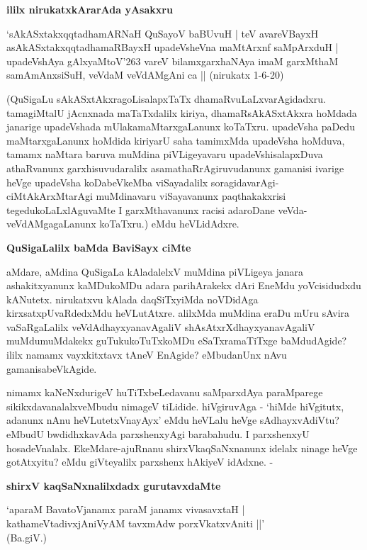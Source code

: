 {\bigskip
\noindent
{\large\bf ililx nirukatxkArarAda yAsakxru}}
\medskip

\begin{shloka}
`sAkASxtakxqqtadhamARNaH QuSayoV baBUvuH | teV avareVBayxH\\\label{106}
asAkASxtakxqqtadhamaRBayxH upadeVsheVna maMtArxnf saMpArxduH |\\
upadeVshAya gAlxyaMtoV\char'263 vareV bilamxgarxhaNAya imaM garxMthaM\\
samAmAnxsiSuH, veVdaM veVdAMgAni ca || \hfill{(nirukatx 1-6-20)}
\end{shloka}

\noindent
(QuSigaLu sAkASxtAkxragoLisalapxTaTx dhamaRvuLaLxvarAgidadxru. tamagiMtalU \hbox{jAcnxnada} maTaTxdalilx kiriya, dha\-maR\-sAkASxtAkxra hoMdada janarige upadeVshada mUlaka\break maMtarxgaLanunx koTaTxru. upadeVsha pa\-De\-du maMtarx\-gaLanunx hoMdida kiriyarU saha tamimxMda upadeVsha hoMduva, tamamx naMtara baruva muMdina\- piVLige\-yavaru upadeVshisalapxDuva athaRvanunx garxhisuvudaralilx asamathaRrAgiruvudanunx gamanisi iva\-rige heVge upadeVsha koDabeVkeMba viSayadalilx soragidavarAgi-ciMtA\-kArxMtarAgi muMdinavaru viSa\-yavanunx paqthakakxrisi tegedukoLaLxlAguvaMte I garxMthavanunx racisi adaroDane veVda-veVdAMgagaLanunx koTaTxru.) eMdu heVLidAdxre.

{\bigskip
\noindent
{\large\bf QuSigaLalilx baMda BaviSayx ciMte}}\label{page106}
\medskip

\noindent
aMdare, aMdina QuSigaLa kAladalelxV muMdina piVLigeya janara ashakitxyanunx kaMDukoMDu adara pari\-hArakekx dAri EneMdu yoVcisidudxdu kANutetx. nirukatxvu kAlada daqSiTxyiMda noVDidAga kirxsatxpUvaR\-dedxMdu heVLutAtxre. alilxMda muMdina eraDu mUru sAvira vaSaRgaLalilx veVdAdhayxyanavAgaliV shAsAtxrX\-dhayxyanavAgaliV muMdumuMdakekx guTukukoTuTxkoMDu eSaTxramaTiTxge baMdudAgide? ililx namamx vayxkitxtavx tAneV EnAgide? eMbudanUnx nAvu gamanisabeVkAgide.

nimamx kaNeNxdurigeV huTiTxbeLedavanu saMparxdAya paraMparege sikikxdavanalalx\-veMbudu nimageV tiLidide. hiVgi\-ruvAga - `hiMde hiVgitutx, adanunx nAnu heVLutetxVnayAyx' eMdu heVLalu heVge sAdhayxvAdiVtu? eMbu\-dU bwdidhxkavAda parxshenxyAgi barabahudu. I parxshenxyU hosadeVnalalx. EkeMdare-ajuRnanu shirxVkaqSaNx\-nanunx idelalx ninage heVge gotAtxyitu? eMdu giVteyalilx parxshenx hAkiyeV idAdxne. -

{\bigskip
\noindent
{\large\bf shirxV kaqSaNxnalilxdadx gurutavxdaMte}}\label{page107}
\medskip

\begin{shloka}
`aparaM BavatoVjanamx paraM janamx vivasavxtaH |\\\label{107}
kathameVtadivxjAniVyAM tavxmAdw porxVkatxvAniti ||'\\
\hfill{(Ba.giV.)}
\end{shloka}

